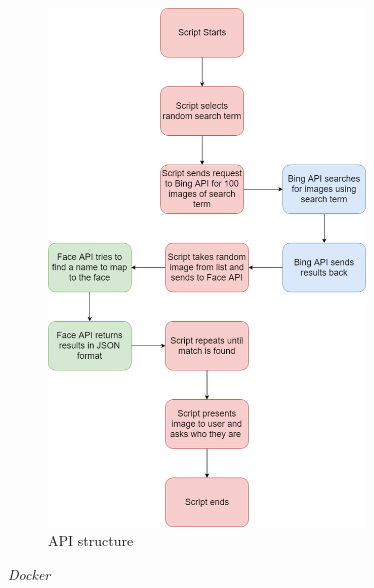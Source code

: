 \documentclass[12pt,a4paper]{article}
\begin{document}
\begin{figure}[h]
    \centering
    \includegraphics[width=0.75\textwidth]{Figs/API_structure.png} 
    \caption{API structure} 
    \label{APIstructure}
\end{figure}   

\emph{Docker} 
 
\end{document}
